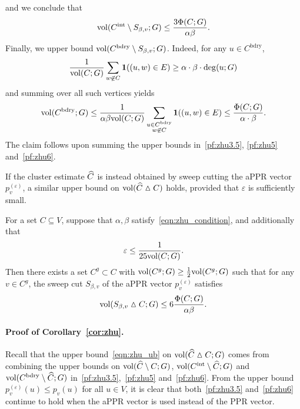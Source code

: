 and we conclude that
\begin{equation}
\label{pf:zhu5}
\mathrm{vol}(C^{\mathrm{int}} \setminus S_{\beta,v}; G) \leq \frac{3\Phi(C;G)}{\alpha\beta}.
\end{equation}
Finally, we upper bound $\mathrm{vol}(C^{\mathrm{bdry}} \setminus S_{\beta,v};G)$. Indeed, for any $u \in C^{\mathrm{bdry}}$,
\begin{equation*}
\frac{1}{\mathrm{vol}(C;G)}\sum_{w \not\in C} \mathbf{1}((u,w) \in E) \geq \alpha \cdot \beta \cdot \deg(u;G)
\end{equation*}
and summing over all such vertices yields
\begin{equation}
\label{pf:zhu6}
\mathrm{vol}(C^{\mathrm{bdry}};G) \leq \frac{1}{\alpha \beta \mathrm{vol}(C;G)}\sum_{\substack{u \in C^{\mathrm{bdry}} \\ w \not\in C}} \mathbf{1}((u,w) \in E) \leq \frac{\Phi(C;G)}{\alpha \cdot \beta}.
\end{equation} 
The claim follows upon summing the upper bounds in~\eqref{pf:zhu3.5}, \eqref{pf:zhu5} and~\eqref{pf:zhu6}.

If the cluster estimate $\widehat{C}$ is instead obtained by sweep cutting the aPPR vector $p_v^{(\varepsilon)}$, a similar upper bound on $\mathrm{vol}(\widehat{C} \vartriangle C)$ holds, provided that $\varepsilon$ is sufficiently small.
\begin{corollary}
	\label{cor:zhu}
	For a set $C \subseteq V$, suppose that $\alpha,\beta$ satisfy~\eqref{eqn:zhu_condition}, and additionally that 
	\begin{equation}
	\label{eqn:zhu_condition_2}
	\varepsilon \leq \frac{1}{25\mathrm{vol}(C;G)}.
	\end{equation}
	Then there exists a set $C^g \subset C$ with $\mathrm{vol}(C^g;G) \geq \frac{1}{2}\mathrm{vol}(C^g;G)$ such that for any $v \in C^g$, the sweep cut $S_{\beta,v}$ of the aPPR vector $p_v^{(\varepsilon)}$ satisfies
	\begin{equation}
	\label{eqn:zhu_ub_appr}
	\mathrm{vol}(S_{\beta,v} \vartriangle C;G) \leq 6\frac{\Phi(C;G)}{\alpha \beta}.
	\end{equation}
\end{corollary}

\paragraph{Proof of Corollary~\ref{cor:zhu}.}
	Recall that the upper bound~\eqref{eqn:zhu_ub} on $\mathrm{vol}(\widehat{C} \vartriangle C;G)$ comes from combining the upper bounds on $\mathrm{vol}(\widehat{C} \setminus C;G)$, $\mathrm{vol}(C^{\mathrm{int}} \setminus \widehat{C};G)$ and $\mathrm{vol}(C^{\mathrm{bdry}} \setminus \widehat{C};G)$ in~\eqref{pf:zhu3.5},~\eqref{pf:zhu5} and~\eqref{pf:zhu6}. From the upper bound $p_v^{(\varepsilon)}(u) \leq p_v(u)$ for all $u \in V$, it is clear that both~\eqref{pf:zhu3.5} and~\eqref{pf:zhu6} continue to hold when the aPPR vector is used instead of the PPR vector. 
	

